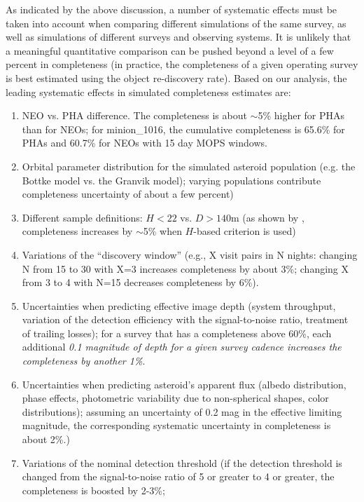 As indicated by the above discussion, a number of systematic effects must be taken into account when
comparing different simulations of the same survey, as well as simulations of different surveys and observing
systems. It is unlikely that a meaningful quantitative comparison can be pushed beyond a level of a few percent
in completeness (in practice, the completeness of a given operating survey is best estimated using the object
re-discovery rate). Based on our analysis, the leading systematic effects in simulated completeness estimates are:
\begin{enumerate}
\item NEO vs. PHA difference. The completeness is about $\sim$5\% higher for PHAs than for NEOs;
for minion\_1016, the cumulative completeness is 65.6\% for PHAs and 60.7\% for NEOs with 15 day MOPS windows.
\item Orbital parameter distribution for the simulated asteroid population (e.g. the Bottke model
             vs. the Granvik model); varying populations contribute completeness uncertainty of about a few percent)
\item Different sample definitions: $H<22$ vs. $D>140$m (as shown by \citealt{GMS2016}, completeness
           increases by $\sim$5\% when $H$-based criterion is used)
\item Variations of the ``discovery window'' (e.g., X visit pairs in N nights: changing N from 15 to 30 with X=3 increases
          completeness by about 3\%; changing X from 3 to 4 with N=15 decreases completeness by 6\%).
\item Uncertainties when predicting effective image depth (system throughput, variation of the detection efficiency
          with the signal-to-noise ratio, treatment of trailing losses); for a survey that has a completeness above 60\%,
          each additional {\it 0.1 magnitude of depth for a given survey cadence increases the completeness by another 1\%}.
\item Uncertainties when predicting asteroid's apparent flux (albedo distribution, phase effects, photometric variability
          due to non-spherical shapes, color distributions); assuming an uncertainty of 0.2 mag in the effective
          limiting magnitude, the corresponding  systematic uncertainty in completeness is about 2\%.)
\item Variations of the nominal detection threshold (if the detection threshold is changed from the
          signal-to-noise ratio of 5 or greater to 4 or greater, the completeness is boosted by 2-3\%;

\end{enumerate}
